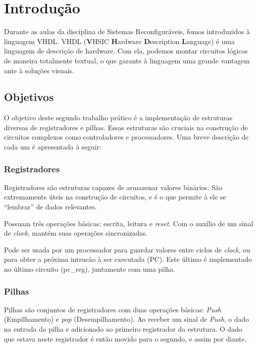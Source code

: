 \documentclass{article}
\begin{document}


\newpage
\thispagestyle{empty}
\tableofcontents

\newpage
\large %

\section{Introdução}

Durante as aulas da disciplina de Sistemas Reconfiguráveis, fomos introduzidos à linguagem VHDL. VHDL (\textbf{V}HSIC \textbf{H}ardware \textbf{D}escription \textbf{L}anguage) é uma linguagem de descrição de hardware. Com ela, podemos montar circuitos lógicos de maneira totalmente textual, o que garante à linguagem uma grande vantagem ante à soluções visuais.

\subsection{Objetivos}

O objetivo deste segundo trabalho prático é a implementação de estruturas diversas de registradores e pilhas. Essas estruturas são cruciais na construção de circuitos complexos como controladores e processadores. Uma breve descrição de cada um é apresentada à seguir:

\subsubsection{Registradores}

Registradores são estruturas capazes de armazenar valores binários. São extremamente úteis na construção de circuitos, e é o que permite à ele se ``lembrar'' de dados relevantes.

Possuam três operações básicas: escrita, leitura e \textit{reset}. Com o auxílio de um sinal de \textit{clock}, mantém suas operações sincronizadas.

Pode ser usada por um processador para guardar valores entre ciclos de \textit{clock}, ou para obter a próxima intrucão à ser executada (PC). Este último é implementado no último circuito (pc\_reg), juntamente com uma pilha.

\subsubsection{Pilhas}

Pilhas são conjuntos de registradores com duas operações básicas: \textit{Push} (Empilhamento) e \textit{pop} (Desempilhamento). Ao receber um sinal de \textit{Push}, o dado na entrada da pilha e adicionado ao primeiro registrador da estrutura. O dado que estava neste registrador é então movido para o segundo, e assim por diante.
\end{document}
